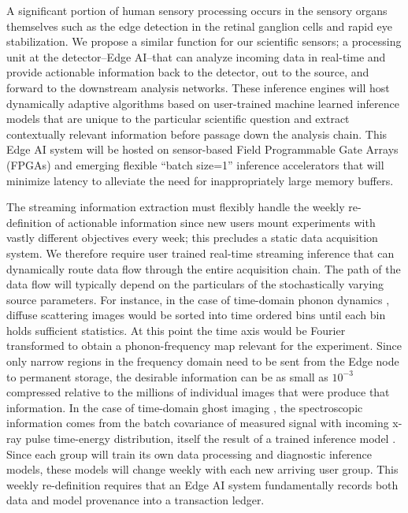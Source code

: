 \documentclass{article}
\begin{document}
A significant portion of human sensory processing occurs in the sensory organs themselves such as the edge detection in the retinal ganglion cells and rapid eye stabilization.
We propose a similar function for our scientific sensors; a processing unit at the detector--Edge AI--that can analyze incoming data in real-time and provide actionable information back to the detector, out to the source, and forward to the downstream analysis networks.
These inference engines will host dynamically adaptive algorithms based on user-trained machine learned inference models that are unique to the particular scientific question and extract contextually relevant information before passage down the analysis chain.
This Edge AI system will be hosted on sensor-based Field Programmable Gate Arrays (FPGAs) and emerging flexible ``batch size=1'' inference accelerators \cite{edgetpu_benchmarks,edgetpu,waveCGRA,CGRAreview,seaofcores} that will minimize latency to alleviate the need for inappropriately large memory buffers.

The streaming information extraction must flexibly handle the weekly re-definition of actionable information since new users mount experiments with vastly different objectives every week; this precludes a static data acquisition system. 
We therefore require user trained real-time streaming inference that can dynamically route data flow through the entire acquisition chain.
The path of the data flow will typically depend on the particulars of the stochastically varying source parameters.
For instance, in the case of time-domain phonon dynamics \cite{Mariano2013}, diffuse scattering images would be sorted into time ordered bins until each bin holds sufficient statistics.
At this point the time axis would be Fourier transformed to obtain a phonon-frequency map relevant for the experiment.
Since only narrow regions in the frequency domain need to be sent from the Edge node to permanent storage, the desirable information can be as small as $10^{-3}$ compressed relative to the millions of individual images that were produce that information.
In the case of time-domain ghost imaging \cite{Taran2020}, the spectroscopic information comes from the batch covariance of measured signal with incoming x-ray pulse time-energy distribution, itself the result of a trained inference model \cite{Audrey}.
Since each group will train its own data processing and diagnostic inference models, these models will change weekly with each new arriving user group.
This weekly re-definition requires that an Edge AI system fundamentally records both data and model provenance into a transaction ledger.
\end{document}
